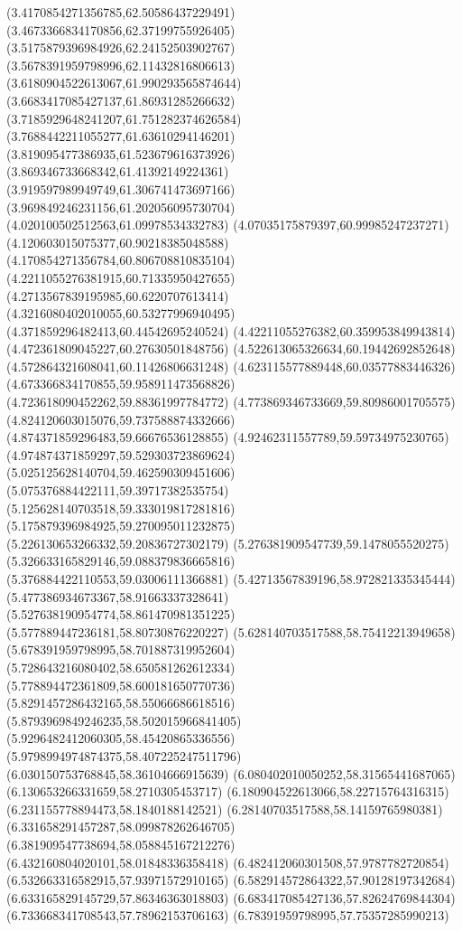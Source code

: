 {(3.4170854271356785,62.50586437229491)
(3.4673366834170856,62.37199755926405)
(3.5175879396984926,62.24152503902767)
(3.5678391959798996,62.11432816806613)
(3.6180904522613067,61.990293565874644)
(3.6683417085427137,61.86931285266632)
(3.7185929648241207,61.751282374626584)
(3.7688442211055277,61.63610294146201)
(3.819095477386935,61.523679616373926)
(3.869346733668342,61.41392149224361)
(3.919597989949749,61.306741473697166)
(3.969849246231156,61.202056095730704)
(4.020100502512563,61.09978534332783)
(4.07035175879397,60.99985247237271)
(4.120603015075377,60.90218385048588)
(4.170854271356784,60.806708810835104)
(4.2211055276381915,60.71335950427655)
(4.2713567839195985,60.6220707613414)
(4.3216080402010055,60.53277996940495)
(4.371859296482413,60.44542695240524)
(4.42211055276382,60.359953849943814)
(4.472361809045227,60.27630501848756)
(4.522613065326634,60.19442692852648)
(4.572864321608041,60.11426806631248)
(4.623115577889448,60.03577883446326)
(4.673366834170855,59.958911473568826)
(4.723618090452262,59.88361997784772)
(4.773869346733669,59.80986001705575)
(4.824120603015076,59.737588874332666)
(4.874371859296483,59.66676536128855)
(4.92462311557789,59.59734975230765)
(4.974874371859297,59.529303723869624)
(5.025125628140704,59.462590309451606)
(5.075376884422111,59.39717382535754)
(5.125628140703518,59.333019817281816)
(5.175879396984925,59.270095011232875)
(5.226130653266332,59.20836727302179)
(5.276381909547739,59.1478055520275)
(5.326633165829146,59.088379836665816)
(5.376884422110553,59.03006111366881)
(5.42713567839196,58.972821335345444)
(5.477386934673367,58.91663337328641)
(5.527638190954774,58.861470981351225)
(5.577889447236181,58.80730876220227)
(5.628140703517588,58.75412213949658)
(5.678391959798995,58.701887319952604)
(5.728643216080402,58.650581262612334)
(5.778894472361809,58.600181650770736)
(5.8291457286432165,58.55066686618516)
(5.8793969849246235,58.502015966841405)
(5.9296482412060305,58.45420865336556)
(5.9798994974874375,58.407225247511796)
(6.030150753768845,58.36104666915639)
(6.080402010050252,58.31565441687065)
(6.130653266331659,58.2710305453717)
(6.180904522613066,58.22715764316315)
(6.231155778894473,58.1840188142521)
(6.28140703517588,58.14159765980381)
(6.331658291457287,58.099878262646705)
(6.381909547738694,58.058845167212276)
(6.432160804020101,58.01848336358418)
(6.482412060301508,57.9787782720854)
(6.532663316582915,57.93971572910165)
(6.582914572864322,57.90128197342684)
(6.633165829145729,57.86346363018803)
(6.683417085427136,57.82624769844304)
(6.733668341708543,57.78962153706163)
(6.78391959798995,57.75357285990213)
}
